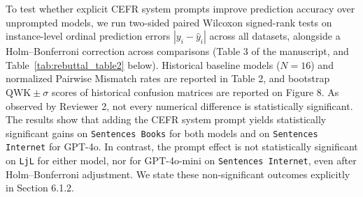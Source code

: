 \documentclass[11pt,a4paper]{article}
\begin{document}
To test whether explicit CEFR system prompts improve prediction accuracy over unprompted models, we run two-sided paired Wilcoxon signed-rank tests on instance-level ordinal prediction errors $|y_i - \hat{y}_i|$ across all datasets, alongside a Holm--Bonferroni correction across comparisons (Table 3 of the manuscript, and Table~\ref{tab:rebuttal_table2} below). Historical baseline models ($N = 16$) and normalized Pairwise Mismatch rates are reported in Table 2, and bootstrap $\text{QWK} \pm \sigma$ scores of historical confusion matrices are reported on Figure 8. As observed by Reviewer 2, not every numerical difference is statistically significant. The results show that adding the CEFR system prompt yields statistically significant gains on \texttt{Sentences Books} for both models and on \texttt{Sentences Internet} for GPT-4o. In contrast, the prompt effect is not statistically significant on \texttt{LjL} for either model, nor for GPT-4o-mini on \texttt{Sentences Internet}, even after Holm--Bonferroni adjustment. We state these non-significant outcomes explicitly in Section 6.1.2.
\end{document}
